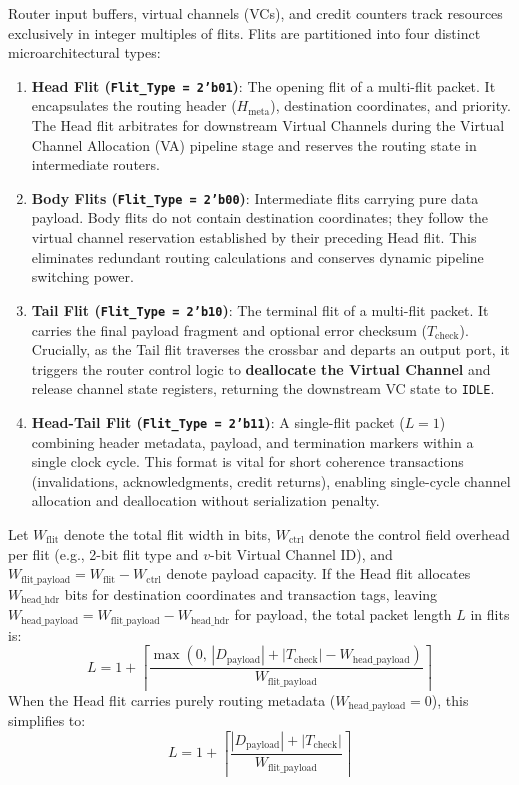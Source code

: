 Router input buffers, virtual channels (VCs), and credit counters track resources exclusively in integer multiples of flits. Flits are partitioned into four distinct microarchitectural types:
\begin{enumerate}
    \item \textbf{Head Flit (\texttt{Flit\_Type = 2'b01})}:
    The opening flit of a multi-flit packet. It encapsulates the routing header ($H_{\text{meta}}$), destination coordinates, and priority. The Head flit arbitrates for downstream Virtual Channels during the Virtual Channel Allocation (VA) pipeline stage and reserves the routing state in intermediate routers.
    \item \textbf{Body Flits (\texttt{Flit\_Type = 2'b00})}:
    Intermediate flits carrying pure data payload. Body flits do not contain destination coordinates; they follow the virtual channel reservation established by their preceding Head flit. This eliminates redundant routing calculations and conserves dynamic pipeline switching power.
    \item \textbf{Tail Flit (\texttt{Flit\_Type = 2'b10})}:
    The terminal flit of a multi-flit packet. It carries the final payload fragment and optional error checksum ($T_{\text{check}}$). Crucially, as the Tail flit traverses the crossbar and departs an output port, it triggers the router control logic to \textbf{deallocate the Virtual Channel} and release channel state registers, returning the downstream VC state to \texttt{IDLE}.
    \item \textbf{Head-Tail Flit (\texttt{Flit\_Type = 2'b11})}:
    A single-flit packet ($L = 1$) combining header metadata, payload, and termination markers within a single clock cycle. This format is vital for short coherence transactions (invalidations, acknowledgments, credit returns), enabling single-cycle channel allocation and deallocation without serialization penalty.
\end{enumerate}

Let $W_{\text{flit}}$ denote the total flit width in bits, $W_{\text{ctrl}}$ denote the control field overhead per flit (e.g., 2-bit flit type and $v$-bit Virtual Channel ID), and $W_{\text{flit\_payload}} = W_{\text{flit}} - W_{\text{ctrl}}$ denote payload capacity. If the Head flit allocates $W_{\text{head\_hdr}}$ bits for destination coordinates and transaction tags, leaving $W_{\text{head\_payload}} = W_{\text{flit\_payload}} - W_{\text{head\_hdr}}$ for payload, the total packet length $L$ in flits is:
\begin{equation}
L = 1 + \left\lceil \frac{\max\left(0,\, |D_{\text{payload}}| + |T_{\text{check}}| - W_{\text{head\_payload}}\right)}{W_{\text{flit\_payload}}} \right\rceil
\label{eq:ch2_flit_decomposition}
\end{equation}
When the Head flit carries purely routing metadata ($W_{\text{head\_payload}} = 0$), this simplifies to:
\begin{equation}
L = 1 + \left\lceil \frac{|D_{\text{payload}}| + |T_{\text{check}}|}{W_{\text{flit\_payload}}} \right\rceil
\label{eq:ch2_flit_decomp_pure}
\end{equation}


